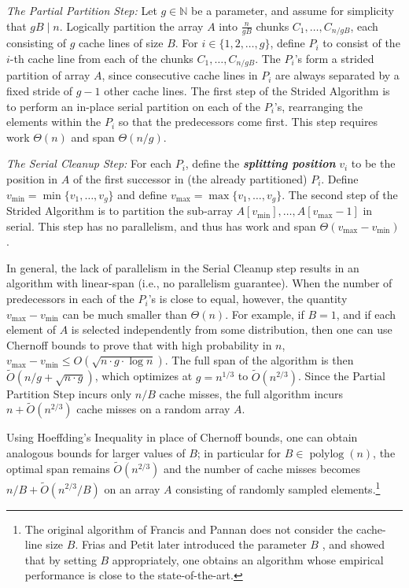 \documentclass[a4paper,UKenglish,cleveref, autoref, thm-restate]{lipics-v2019}
\DeclareMathOperator{\polylog}{\text{polylog}}
\newcommand{\defn}[1]{{\textit{\textbf{\boldmath #1}}}}
\begin{document}
\noindent\emph{The Partial Partition Step: }
Let $g \in \mathbb{N}$ be a parameter, and assume for simplicity
that $gB \mid n$. Logically partition the array $A$ into
$\frac{n}{gB}$ chunks $C_1, \ldots, C_{n / gB}$, each consisting
of $g$ cache lines of size $B$. For $i \in \{1, 2, \ldots, g\}$,
define $P_i$ to consist of the $i$-th cache line from each of the
chunks $C_1, \ldots, C_{n / gB}$. The $P_i$'s 
form a strided partition of array $A$, since consecutive cache
lines in $P_i$ are always separated by a fixed stride of $g - 1$
other cache lines.
The first step of the Strided Algorithm is to perform an in-place
serial partition on each of the $P_i$'s, rearranging the elements
within the $P_i$ so that the predecessors come first. This step
requires work $\Theta(n)$ and span $\Theta(n/g)$.

\noindent\emph{The Serial Cleanup Step: } For each $P_i$, define the
\defn{splitting position} $v_i$ to be the position in $A$ of the
first successor in (the already partitioned) $P_i$. Define
$v_{\text{min}} = \min\{v_1, \ldots, v_{g}\}$ and define
$v_{\text{max}} = \max\{v_1, \ldots, v_{g}\}$. 
The second step of the Strided Algorithm is to 
partition the sub-array ${A[v_{\text{min}}],\ldots,
A[v_{\text{max}}-1]}$ in serial. This step has no parallelism, and thus has
work and span $\Theta(v_{\text{max}} - v_{\text{min}})$.

In general, the lack of parallelism in the Serial Cleanup step 
results in an algorithm with linear-span (i.e., no
parallelism guarantee).  When the number of predecessors in each
of the $P_i$'s is close to equal, however, the quantity
$v_{\text{max}} - v_{\text{min}}$ can be much smaller than
$\Theta(n)$. For example, if $B = 1$, and if each element of $A$
is selected independently from some distribution, then one can
use Chernoff bounds to prove that with high probability in $n$,
$v_{\text{max}} - v_{\text{min}} \le O(\sqrt{n \cdot g \cdot \log
n})$.  The full span of the algorithm is then $\tilde{O}(n/g +
\sqrt{n \cdot g})$, which optimizes at $g = n^{1/3}$ to
$\tilde{O}(n^{2/3})$. Since the Partial Partition Step incurs
only $n / B$ cache misses, the full algorithm incurs $n +
\tilde{O}(n^{2/3})$ cache misses on a random array $A$.

Using Hoeffding's Inequality in place of Chernoff bounds, one can
obtain analogous bounds for larger values of $B$; in particular
for $B \in \polylog(n)$, the optimal span remains
$\tilde{O}(n^{2/3})$ and the number of cache misses becomes $n /
B + \tilde{O}(n^{2/3} / B)$ on an array $A$ consisting of
randomly sampled elements.\footnote{The original algorithm of
Francis and Pannan \cite{FrancisPa92} does not consider the
cache-line size $B$. Frias and Petit later introduced the
parameter $B$ \cite{Frias08}, and showed that by setting $B$
appropriately, one obtains an algorithm whose empirical
performance is close to the state-of-the-art.}
\end{document}
